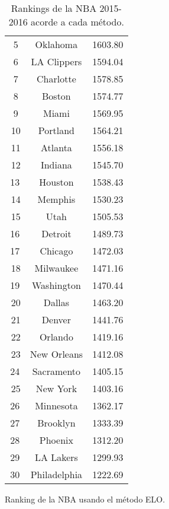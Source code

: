 \documentclass[a4paper]{article}
\newcommand{\bigfatgreen}{\begin{tikzpicture}[x=0.5pt,y=0.6pt,yscale=-.5,xscale=.5]
\draw  [fill=ForestGreen!70,fill opacity=1] (100,123.22) -- (113.25,113) -- (126.5,123.22) -- (119.88,123.22) -- (119.88,138.54) -- (106.63,138.54) -- (106.63,123.22) -- cycle ;
\end{tikzpicture}}
\newcommand{\bigfatred}{\begin{tikzpicture}[x=0.5pt,y=0.6pt,yscale=-.5,xscale=.5, rotate= 180]
\draw  [fill=red!70,fill opacity=1] (100,123.22) -- (113.25,113) -- (126.5,123.22) -- (119.88,123.22) -- (119.88,138.54) -- (106.63,138.54) -- (106.63,123.22) -- cycle ;
\end{tikzpicture}}
\begin{document}
\begin{table}[h]
{\begin{subtable}{0.33\textwidth}
\begin{tabular}{|c|c|c|}
                \bigfatred\,5 & Oklahoma & 1603.80 \\
                \bigfatgreen\,6 & LA Clippers & 1594.04 \\
                \bigfatgreen\,7 & Charlotte & 1578.85 \\
                \bigfatgreen\,8 & Boston & 1574.77 \\
                \bigfatred\,9 & Miami & 1569.95 \\
                \bigfatred\,10 & Portland & 1564.21 \\
                \bigfatred\,11 & Atlanta & 1556.18 \\
                \bigfatred\,12 & Indiana & 1545.70 \\
                13 & Houston & 1538.43 \\
                \bigfatgreen\,14 & Memphis & 1530.23 \\
                \bigfatgreen\,15 & Utah & 1505.53 \\
                16 & Detroit & 1489.73 \\
                17 & Chicago & 1472.03 \\
                \bigfatgreen\,18 & Milwaukee & 1471.16 \\
                19 & Washington & 1470.44 \\
                \bigfatred\,20 & Dallas &  1463.20 \\
                \bigfatgreen\,21 & Denver & 1441.76 \\
                \bigfatred\,22 & Orlando & 1419.16 \\
                \bigfatgreen\,23 & New Orleans & 1412.08 \\
                24 & Sacramento & 1405.15 \\
                \bigfatred\,25 & New York & 1403.16 \\
                26 & Minnesota & 1362.17 \\
                27 & Brooklyn & 1333.39 \\
                28 & Phoenix & 1312.20 \\
                29 & LA Lakers & 1299.93 \\
                30 & Philadelphia & 1222.69 \\
                \hline
            \end{tabular}
            \caption{Ranking de la NBA usando el m\'etodo ELO.}
            \label{subtab:NBA_ELO}
        \end{subtable}%
    }
    \caption{Rankings de la NBA 2015-2016 acorde a cada m\'etodo.}
    \label{tab:NBA}
\end{table}
\end{document}
